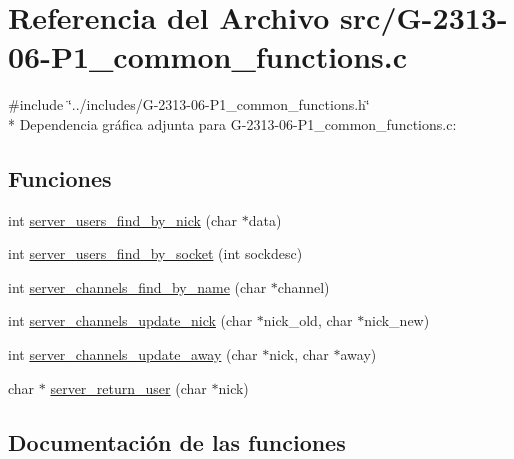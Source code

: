 \hypertarget{G-2313-06-P1__common__functions_8c}{}\section{Referencia del Archivo src/\+G-\/2313-\/06-\/\+P1\+\_\+common\+\_\+functions.c}
\label{G-2313-06-P1__common__functions_8c}
{\ttfamily \#include \char`\"{}../includes/\+G-\/2313-\/06-\/\+P1\+\_\+common\+\_\+functions.\+h\char`\"{}}\\*
Dependencia gráfica adjunta para G-\/2313-\/06-\/\+P1\+\_\+common\+\_\+functions.c\+:
\subsection*{Funciones}
\begin{DoxyCompactItemize}
\item 
int \hyperlink{G-2313-06-P1__common__functions_8c_a61cca6f1a1adeb81f722ecc2ff35aab5}{server\+\_\+users\+\_\+find\+\_\+by\+\_\+nick} (char $\ast$data)
\item 
int \hyperlink{G-2313-06-P1__common__functions_8c_a485e68f66db6ae4b7297d99c32afe30a}{server\+\_\+users\+\_\+find\+\_\+by\+\_\+socket} (int sockdesc)
\item 
int \hyperlink{G-2313-06-P1__common__functions_8c_a875ae5278d95716b494b26f96cf4ae6e}{server\+\_\+channels\+\_\+find\+\_\+by\+\_\+name} (char $\ast$channel)
\item 
int \hyperlink{G-2313-06-P1__common__functions_8c_ae8a282d9cdfc8187b8e74e368bc56d92}{server\+\_\+channels\+\_\+update\+\_\+nick} (char $\ast$nick\+\_\+old, char $\ast$nick\+\_\+new)
\item 
int \hyperlink{G-2313-06-P1__common__functions_8c_af9aeb632d55a4cbbe842ab97001b5128}{server\+\_\+channels\+\_\+update\+\_\+away} (char $\ast$nick, char $\ast$away)
\item 
char $\ast$ \hyperlink{G-2313-06-P1__common__functions_8c_a230bf24ab7ae18d2e81ebc1d3575a6ad}{server\+\_\+return\+\_\+user} (char $\ast$nick)
\end{DoxyCompactItemize}


\subsection{Documentación de las funciones}
